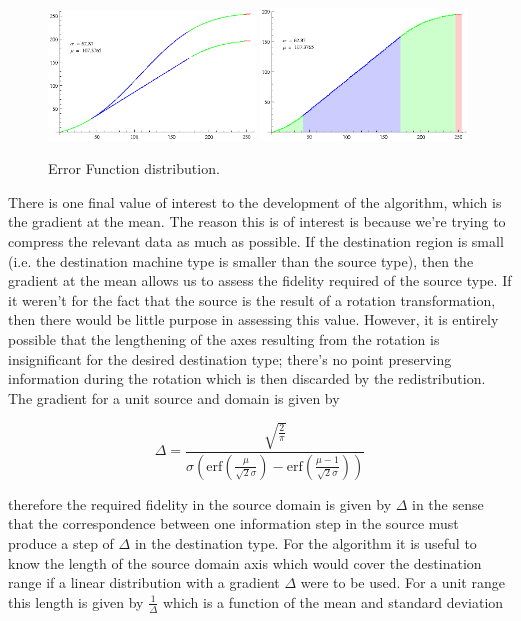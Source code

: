 \begin{figure}[h!]
  \caption{Error Function distribution.}
  \label{fig:ERF}
  \centering
    \includegraphics[width=0.49\textwidth]{Chapter2/Figs/ERFSmooth2.eps}
    \includegraphics[width=0.49\textwidth]{Chapter2/Figs/ERFColor2.eps}
\end{figure}

There is one final value of interest to the development of the algorithm, which is the gradient at the mean. The reason this is of interest is because we're trying to compress the relevant data as much as possible. If the destination region is small (i.e. the destination machine type is smaller than the source type), then the gradient at the mean allows us to assess the fidelity required of the source type. If it weren't for the fact that the source is the result of a rotation transformation, then there would be little purpose in assessing this value. However, it is entirely possible that the lengthening of the axes resulting from the rotation is insignificant for the desired destination type; there's no point preserving information during the rotation which is then discarded by the redistribution. The gradient for a unit source and domain is given by

\begin{equation}
\Delta = \frac{\sqrt{\frac{2}{\pi }}}{\sigma  \left(\text{erf}\left(\frac{\mu }{\sqrt{2} \sigma }\right)-\text{erf}\left(\frac{\mu -1}{\sqrt{2} \sigma }\right)\right)}
\end{equation}

therefore the required fidelity in the source domain is given by $\Delta$ in the sense that the correspondence between one information step in the source must produce a step of $\Delta$ in the destination type. For the algorithm it is useful to know the length of the source domain axis which would cover the destination range if a linear distribution with a gradient $\Delta$ were to be used. For a unit range this length is given by $\frac{1}{\Delta}$ which is a function of the mean and standard deviation

